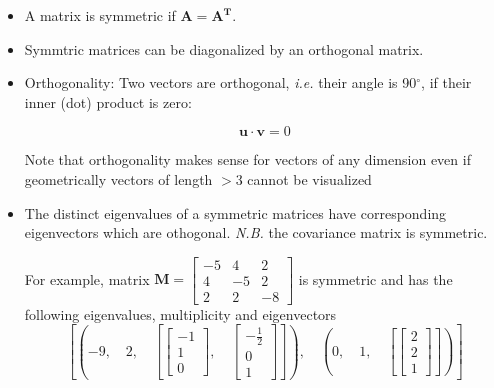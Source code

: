 \begin{itemize}

\item A matrix is symmetric if $\mathbf{A = A^T}$.

\item Symmtric matrices can be diagonalized by an orthogonal matrix. 

\item Orthogonality: Two vectors are orthogonal, \emph{i.e.} their angle is 90$^{\circ}$,
if their inner (dot) product is zero:

$$
\mathbf{u \cdot v} = 0
$$

Note that orthogonality makes sense for vectors of any dimension even if geometrically
vectors of length $>3$ cannot be visualized

\item The distinct eigenvalues of a symmetric matrices have corresponding eigenvectors
which are othogonal. \emph{N.B.} the covariance matrix is symmetric.

For example, matrix $\mathbf{M}= \left[\begin{matrix}-5 & 4 & 2\\4 & -5 & 2\\2 & 2 & -8\end{matrix}\right]$
is symmetric and has the following eigenvalues, multiplicity and eigenvectors
$$\left [ \left ( -9, \quad 2, \quad \left [ \left[\begin{matrix}-1\\1\\0\end{matrix}\right],
\quad \left[\begin{matrix}- \frac{1}{2}\\0\\1\end{matrix}\right]\right ]\right ),
\quad \left ( 0, \quad 1, \quad \left [ \left[\begin{matrix}2\\2\\1\end{matrix}\right]\right ]\right )\right ]$$


\end{itemize}
